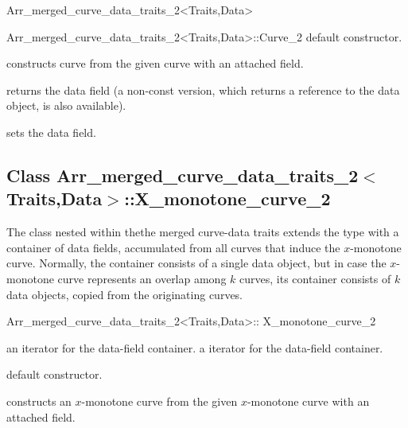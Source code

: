 \begin{ccRefClass}{Arr_merged_curve_data_traits_2<Traits,Data>}
\begin{ccClass}{Arr_merged_curve_data_traits_2<Traits,Data>::Curve_2}
    {default constructor.}

    {constructs curve from the given  curve with an attached
      field.}

\ccAccessFunctions

  {returns the data field (a non-const version, which returns a reference
   to the data object, is also available).}

  {sets the data field.}

\end{ccClass}

\subsection*{Class Arr\_merged\_curve\_data\_traits\_2$<$Traits,Data$>$::X\_monotone\_curve\_2}

The  class nested within thethe merged 
curve-data traits extends the  type with 
a container of data fields, accumulated from all curves that induce the
$x$-monotone curve. Normally, the container consists of a single data object,
but in case the $x$-monotone curve represents an overlap among $k$ curves,
its container consists of $k$ data objects, copied from the originating curves.

\begin{ccClass}{Arr_merged_curve_data_traits_2<Traits,Data>::
                X_monotone_curve_2}

\ccInheritsFrom

\ccTypes

    {an iterator for the data-field container.}
\ccGlue
{}
    {a  iterator for the data-field container.}

\ccCreation
{}

    {default constructor.}

    {constructs an $x$-monotone curve from the given  $x$-monotone
     curve with an attached  field.}


\end{ccClass}
\end{ccRefClass}
